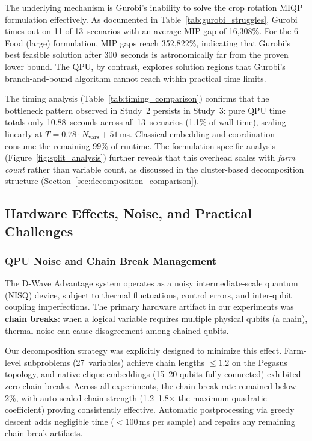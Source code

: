 The underlying mechanism is Gurobi's inability to solve the crop rotation MIQP formulation effectively. As documented in Table~\ref{tab:gurobi_struggles}, Gurobi times out on 11 of 13~scenarios with an average MIP gap of 16,308\%. For the 6-Food (large) formulation, MIP gaps reach 352,822\%, indicating that Gurobi's best feasible solution after 300~seconds is astronomically far from the proven lower bound. The QPU, by contrast, explores solution regions that Gurobi's branch-and-bound algorithm cannot reach within practical time limits.

The timing analysis (Table~\ref{tab:timing_comparison}) confirms that the bottleneck pattern observed in Study~2 persists in Study~3: pure QPU time totals only 10.88~seconds across all 13~scenarios (1.1\% of wall time), scaling linearly at $T = 0.78 \cdot N_{\text{vars}} + 51$\,ms. Classical embedding and coordination consume the remaining 99\% of runtime. The formulation-specific analysis (Figure~\ref{fig:split_analysis}) further reveals that this overhead scales with \textit{farm count} rather than variable count, as discussed in the cluster-based decomposition structure (Section~\ref{sec:decomposition_comparison}).

\subsection{Hardware Effects, Noise, and Practical Challenges}

\subsubsection{QPU Noise and Chain Break Management}

The D-Wave Advantage system operates as a noisy intermediate-scale quantum (NISQ) device, subject to thermal fluctuations, control errors, and inter-qubit coupling imperfections. The primary hardware artifact in our experiments was \textbf{chain breaks}: when a logical variable requires multiple physical qubits (a chain), thermal noise can cause disagreement among chained qubits.

Our decomposition strategy was explicitly designed to minimize this effect. Farm-level subproblems (27~variables) achieve chain lengths $\leq 1.2$ on the Pegasus topology, and native clique embeddings (15--20 qubits fully connected) exhibited zero chain breaks. Across all experiments, the chain break rate remained below 2\%, with auto-scaled chain strength (1.2--1.8$\times$ the maximum quadratic coefficient) proving consistently effective. Automatic postprocessing via greedy descent adds negligible time ($<$100\,ms per sample) and repairs any remaining chain break artifacts.


